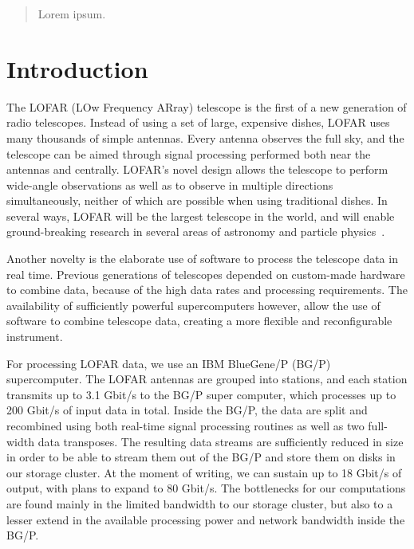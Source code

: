 \documentclass{llncs}
\begin{document}
\newcommand{\comment}[1]{}
\begin{abstract}
Lorem ipsum.
\end{abstract}
\section{Introduction}

\comment{
lofar:
  - overview
  - #stations
  - data rates

pulsar pipeline:  
  - new astronomical opportunities:
        - dynamic focus -> hundreds of simultaenous observations, which regular dishes must do sequentially
        - broad sky view -> surveys
        - extremely high data rates (up to 200 Gbit/s in, 18 Gbit/s out)
                - disks limits output rate, to be raised to 80Gbit/s out.

software correlator benefits:
  - flexibility
  - fast rollout of experimental features
  - easy bugfixing
  - high level programming -> advanced and complex features

}

\comment{
}

The LOFAR (LOw Frequency ARray) telescope is the first of a new generation of radio telescopes. Instead of using a set of large, expensive dishes, LOFAR uses many thousands of simple antennas. Every antenna observes the full sky, and the telescope can be aimed through signal processing performed both near the antennas and centrally. LOFAR's novel design allows the telescope to perform wide-angle observations as well as to observe in multiple directions simultaneously, neither of which are possible when using traditional dishes. In several ways, LOFAR will be the largest telescope in the world, and will enable ground-breaking research in several areas of astronomy and particle physics~\cite{Bruyn:02}.

Another novelty is the elaborate use of software to process the telescope data in real time. Previous generations of telescopes depended on custom-made hardware to combine data, because of the high data rates and processing requirements. The availability of sufficiently powerful supercomputers however, allow the use of software to combine telescope data, creating a more flexible and reconfigurable instrument.

For processing LOFAR data, we use an IBM BlueGene/P (BG/P) supercomputer. The LOFAR antennas are grouped into stations, and each station transmits up to 3.1 Gbit/s to the BG/P super computer, which processes up to 200 Gbit/s of input data in total. Inside the BG/P, the data are split and recombined using both real-time signal processing routines as well as two full-width data transposes. The resulting data streams are sufficiently reduced in size in order to be able to stream them out of the BG/P and store them on disks in our storage cluster. At the moment of writing, we can sustain up to 18 Gbit/s of output, with plans to expand to 80 Gbit/s. The bottlenecks for our computations are found mainly in the limited bandwidth to our storage cluster, but also to a lesser extend in the available processing power and network bandwidth inside the BG/P.
\end{document}
